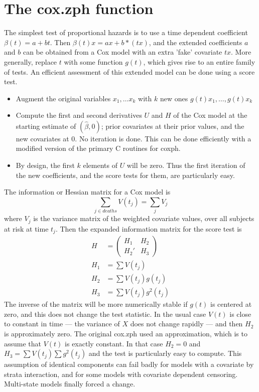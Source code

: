 \documentclass{article}
\begin{document}
\section{The cox.zph function}
The simplest test of proportional hazards is to use a time dependent
coefficient $\beta(t) = a + bt$.
Then $\beta(t) x = ax + b*(tx)$, and the extended coefficients $a$ and $b$
can be obtained from a Cox model with an extra 'fake' covariate $tx$.
More generally, replace $t$ with some function $g(t)$, which gives rise to
an entire family of tests.
An efficient assessment of this extended model can be done using a score
test.
\begin{itemize}
  \item Augment the original variables $x_1, \ldots x_k$ with $k$ new ones
$g(t)x_1, \ldots, g(t)x_k$
  \item Compute the first and second derivatives $U$ and $H$ of the Cox model
at the starting estimate of $(\hat\beta, 0)$; prior covariates at their
prior values, and the new covariates at 0.  No iteration is done.
This can be done efficiently with a modified version of the primary C routines
for coxph.
  \item By design, the first $k$ elements of $U$ will be zero. Thus the 
first iteration of the new coefficients, and the score tests for them, are
particularly easy.  
\end{itemize}

The information or Hessian matrix for a Cox model is 
$$ \sum_{j \in deaths} V(t_j)  = \sum_jV_j$$
where $V_j$ is the variance matrix of the weighted covariate values, over
all subjects at risk at time $t_j$.
Then the expanded information matrix for the score test is
\begin{align*}
  H &= \left(\begin{array}{cc}  H_1 & H_2 \\ H_2' & H_3 \end{array} \right) \\
  H_1 &= \sum V(t_j) \\
  H_2 &= \sum V(t_j) g(t_j) \\
  H_3 &= \sum V(t_j) g^2(t_j)
\end{align*}
The inverse of the matrix will be more numerically stable if $g(t)$ is centered
at zero, and this does not change the test statistic.
In the usual case $V(t)$ is close to constant in time --- the variance of
$X$ does not change rapidly --- and then $H_2$ is approximately zero.
The original cox.zph used an approximation, which is to assume that
$V(t)$ is exactly constant.
In that case $H_2=0$ and $H_3= \sum V(t_j) \sum g^2(t_j)$ and the test
is particularly easy to compute.
This assumption of identical components can fail badly for models with a
covariate by strata interaction, and for some models with covariate
dependent censoring.
Multi-state models finally forced a change.
\end{document}

